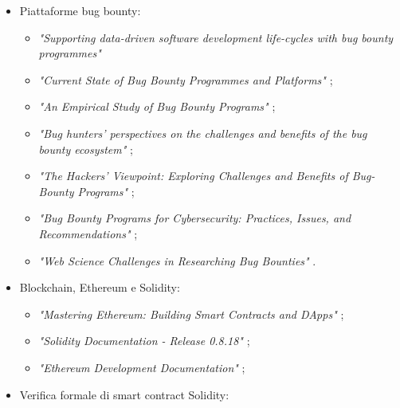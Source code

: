 \begin{itemize}

\item Piattaforme bug bounty:
\begin{itemize}

\item \textit{"Supporting data-driven software development life-cycles with bug bounty programmes"} \cite{walshe2023bountythesis}

\item \textit{"Current State of Bug Bounty Programmes and Platforms"} \cite{walshe2023bountythesis3};

\item \textit{"An Empirical Study of Bug Bounty Programs"} \cite{walshe2020bountypaper};

\item \textit{"Bug hunters' perspectives on the challenges and benefits of the bug bounty ecosystem"} \cite{akgul2023bughunters};

\item \textit{"The Hackers' Viewpoint: Exploring Challenges and Benefits of Bug-Bounty Programs"} \cite{akgul2020bughunters};

\item \textit{"Bug Bounty Programs for Cybersecurity: Practices, Issues, and Recommendations"} \cite{malladi2020bugbounty};

\item \textit{"Web Science Challenges in Researching Bug Bounties"} \cite{fryer2017bugbounty}.

\end{itemize}

\item Blockchain, Ethereum e Solidity:
\begin{itemize}

\item \textit{"Mastering Ethereum: Building Smart Contracts and DApps"} \cite{antonopoulos2018mastering};

\item \textit{"Solidity Documentation - Release 0.8.18"} \cite{solidity0.8.18doc};

\item \textit{"Ethereum Development Documentation"} \cite{ethereum2024doc};

\end{itemize}

\item Verifica formale di smart contract Solidity:
\begin{itemize}


\end{itemize}
\end{itemize}
